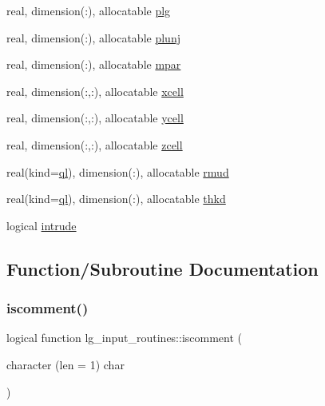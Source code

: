 \begin{DoxyCompactItemize}
\item 
real, dimension(\+:), allocatable \hyperlink{namespacelg__input__routines_a0218ae3d8505863872da20098e847208}{plg}
\item 
real, dimension(\+:), allocatable \hyperlink{namespacelg__input__routines_ae9c8530efd2c73ef8ec9473314036af3}{plunj}
\item 
real, dimension(\+:), allocatable \hyperlink{namespacelg__input__routines_a5acee0395ffda270aed2b17278023be5}{mpar}
\item 
real, dimension(\+:,\+:), allocatable \hyperlink{namespacelg__input__routines_ac7350915506378146fba877e70cf9e5a}{xcell}
\item 
real, dimension(\+:,\+:), allocatable \hyperlink{namespacelg__input__routines_aeabe65741a073352b67eaf406562ccc2}{ycell}
\item 
real, dimension(\+:,\+:), allocatable \hyperlink{namespacelg__input__routines_a360b94863ccd8f0b4888cf64d3f7f2da}{zcell}
\item 
real(kind=\hyperlink{namespacelg__input__routines_a8c3fd17aa03dd450ed3e242df939ad01}{ql}), dimension(\+:), allocatable \hyperlink{namespacelg__input__routines_a8b4948887cc082e53fbe8765475f1a6e}{rmud}
\item 
real(kind=\hyperlink{namespacelg__input__routines_a8c3fd17aa03dd450ed3e242df939ad01}{ql}), dimension(\+:), allocatable \hyperlink{namespacelg__input__routines_ae7adf9ffc0177ce752a4b28042df09ce}{thkd}
\item 
logical \hyperlink{namespacelg__input__routines_a24ada50400969251dbef61f7706a66cc}{intrude}
\end{DoxyCompactItemize}


\subsection{Function/\+Subroutine Documentation}
\mbox{\label{namespacelg__input__routines_a8433a2003dce3e9ebdd1aa0a11e16538}} 
\subsubsection{\texorpdfstring{iscomment()}{iscomment()}}
{\footnotesize\ttfamily logical function lg\+\_\+input\+\_\+routines\+::iscomment (\begin{DoxyParamCaption}\item[{character (len = 1)}]{char }\end{DoxyParamCaption})}

